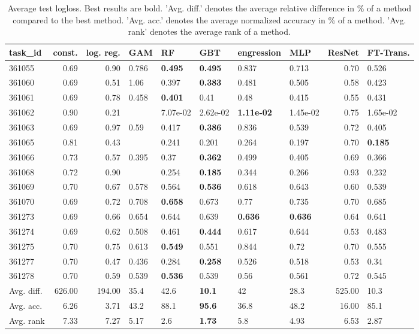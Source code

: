 \begin{table}[ht!]
\centering
\begingroup\footnotesize
\begin{tabular}{lrrlllllrl}
  \hline
\hline
task\_id & const. & log. reg. & GAM & RF & GBT & engression & MLP & ResNet & FT-Trans. \\ 
  \hline
361055 & 0.69 & 0.90 & 0.786 & \textbf{0.495} & \textbf{0.495} & 0.837 & 0.713 & 0.70 & 0.526 \\ 
  361060 & 0.69 & 0.51 & 1.06 & 0.397 & \textbf{0.383} & 0.481 & 0.505 & 0.58 & 0.423 \\ 
  361061 & 0.69 & 0.78 & 0.458 & \textbf{0.401} & 0.41 & 0.48 & 0.415 & 0.55 & 0.431 \\ 
  361062 & 0.90 & 0.21 &  & 7.07e-02 & 2.62e-02 & \textbf{1.11e-02} & 1.45e-02 & 0.75 & 1.65e-02 \\ 
  361063 & 0.69 & 0.97 & 0.59 & 0.417 & \textbf{0.386} & 0.836 & 0.539 & 0.72 & 0.405 \\ 
  361065 & 0.81 & 0.43 &  & 0.241 & 0.201 & 0.264 & 0.197 & 0.70 & \textbf{0.185} \\ 
  361066 & 0.73 & 0.57 & 0.395 & 0.37 & \textbf{0.362} & 0.499 & 0.405 & 0.69 & 0.366 \\ 
  361068 & 0.72 & 0.90 &  & 0.254 & \textbf{0.185} & 0.344 & 0.266 & 0.93 & 0.232 \\ 
  361069 & 0.70 & 0.67 & 0.578 & 0.564 & \textbf{0.536} & 0.618 & 0.643 & 0.60 & 0.539 \\ 
  361070 & 0.69 & 0.72 & 0.708 & \textbf{0.658} & 0.673 & 0.77 & 0.735 & 0.70 & 0.685 \\ 
  361273 & 0.69 & 0.66 & 0.654 & 0.644 & 0.639 & \textbf{0.636} & \textbf{0.636} & 0.64 & 0.641 \\ 
  361274 & 0.69 & 0.62 & 0.508 & 0.461 & \textbf{0.444} & 0.617 & 0.644 & 0.53 & 0.483 \\ 
  361275 & 0.70 & 0.75 & 0.613 & \textbf{0.549} & 0.551 & 0.844 & 0.72 & 0.70 & 0.555 \\ 
  361277 & 0.70 & 0.47 & 0.436 & 0.284 & \textbf{0.258} & 0.526 & 0.518 & 0.53 & 0.34 \\ 
  361278 & 0.70 & 0.59 & 0.539 & \textbf{0.536} & 0.539 & 0.56 & 0.561 & 0.72 & 0.545 \\ 
   \hline
Avg. diff. & 626.00 & 194.00 & 35.4 & 42.6 & \textbf{10.1} & 42 & 28.3 & 525.00 & 10.3 \\ 
  Avg. acc. & 6.26 & 3.71 & 43.2 & 88.1 & \textbf{95.6} & 36.8 & 48.2 & 16.00 & 85.1 \\ 
  Avg. rank & 7.33 & 7.27 & 5.17 & 2.6 & \textbf{1.73} & 5.8 & 4.93 & 6.53 & 2.87 \\ 
   \hline
\hline
\end{tabular}
\endgroup
\caption{Average test logloss. 
                  Best results are bold. 
                  'Avg. diff.' denotes the average relative difference in \% of a method compared to the best method.
                  'Avg. acc.' denotes the average normalized accuracy in \% of a method.
                  'Avg. rank' denotes the average rank of a method.} 
\label{TABLES/table_results_logloss_mahalanobis}
\end{table}
